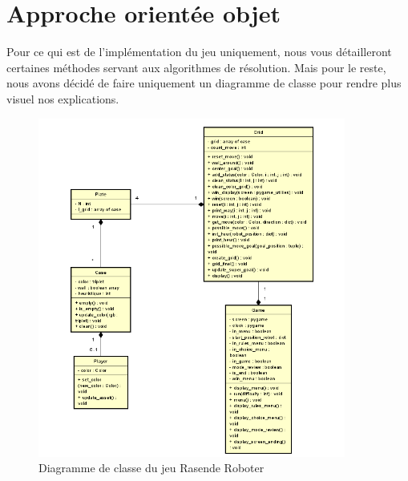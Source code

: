 \documentclass{article}
\begin{document}
\section{Approche orientée objet}
Pour ce qui est de l'implémentation du jeu uniquement, nous vous détailleront certaines méthodes servant aux algorithmes de résolution. Mais pour le reste, nous avons décidé de faire uniquement un diagramme de classe pour rendre plus visuel nos explications. 
\begin{figure}[h]
  \centering  
  \includegraphics[width=0.90\textwidth]{diagram_class.png}  
  \caption{Diagramme de classe du jeu Rasende Roboter} 
  \label{fig:Plateau}  
\end{figure}
\end{document}
